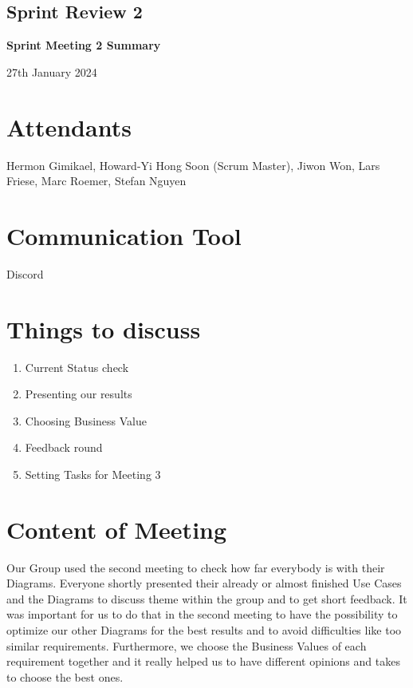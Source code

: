 \documentclass{article}
\begin{document}
\subsection{Sprint Review 2}
\begin{center}
    {\Large \textbf{Sprint Meeting 2 Summary}}
    
    \vspace{0.5cm}
    
    {\large 27th January 2024}
\end{center}

\section*{Attendants}
Hermon Gimikael, Howard-Yi Hong Soon (Scrum Master), Jiwon Won, Lars Friese, Marc Roemer, Stefan Nguyen

\section*{Communication Tool}
Discord

\section*{Things to discuss}
\begin{enumerate}
    \item Current Status check
    \item Presenting our results
    \item Choosing Business Value 
    \item Feedback round
    \item Setting Tasks for Meeting 3
\end{enumerate}

\section*{Content of Meeting}
Our Group used the second meeting to check how far everybody is with their Diagrams. Everyone shortly presented their already or almost finished Use Cases and the Diagrams to discuss theme within the group and to get short feedback. It was important for us to do that in the second meeting to have the possibility to optimize our other Diagrams for the best results and to avoid difficulties like too similar requirements. Furthermore, we choose the Business Values of each requirement together and it really helped us to have different opinions and takes to choose the best ones. 
\end{document}
